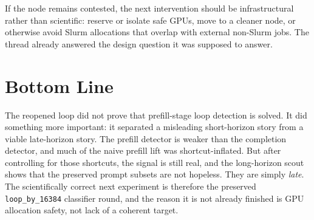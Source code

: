 \documentclass[11pt]{article}
\begin{document}
If the node remains contested, the next intervention should be infrastructural rather than scientific: reserve or isolate safe GPUs, move to a cleaner node, or otherwise avoid Slurm allocations that overlap with external non-Slurm jobs. The thread already answered the design question it was supposed to answer.

\section*{Bottom Line}
The reopened loop did not prove that prefill-stage loop detection is solved. It did something more important: it separated a misleading short-horizon story from a viable late-horizon story. The prefill detector is weaker than the completion detector, and much of the naive prefill lift was shortcut-inflated. But after controlling for those shortcuts, the signal is still real, and the long-horizon scout shows that the preserved prompt subsets are not hopeless. They are simply \emph{late}. The scientifically correct next experiment is therefore the preserved \texttt{loop\_by\_16384} classifier round, and the reason it is not already finished is GPU allocation safety, not lack of a coherent target.
\end{document}
